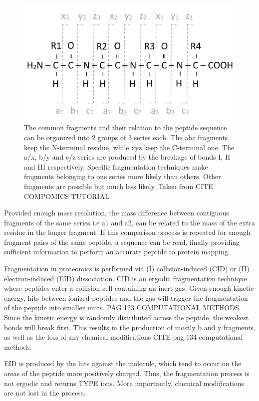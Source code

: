 \documentclass[11pt, a4paper]{report}
\begin{document}
\begin{figure}[!h]
\includegraphics[width=\textwidth]{abcxyz}
\caption{The common fragments and their relation to the peptide sequence can be organized into 2 groups of 3 series each. The abc fragments keep the N-terminal residue, while xyz keep the C-terminal one. The a/x, b/y and c/z series are produced by the breakage of bonds I, II and III respectively. Specific fragmentation techniques make fragments belonging to one series more likely than others. Other fragments are possible but much less likely. Taken from CITE COMPOMICS TUTORIAL}
\label{fig:abcxyz}
\end{figure}

Provided enough mass resolution, the mass difference between contiguous fragments of the same series i.e a1 and a2, can be related to the mass of the extra residue in the longer fragment. If this comparison process is repeated for enough fragment pairs of the same peptide, a sequence can be read, finally providing sufficient information to perform an accurate peptide to protein mapping.

Fragmentation in proteomics is performed via (I) collision-induced (CID) or (II) electron-induced (EID) dissociation. CID is an ergodic fragmentation technique where peptides enter a collision cell containing an inert gas. Given enough kinetic energy, hits between ionized peptides and the gas will trigger the fragmentation of the peptide into smaller units. PAG 123 COMPUTATIONAL METHODS. Since the kinetic energy is randomly distributed across the peptide, the weakest bonds will break first. This results in the production of mostly b and y fragments, as well as the loss of any chemical modifications CITE pag 134 computational methods.

EID is produced by the hits against the molecule, which tend to occur on the areas of the peptide more positively charged. Thus, the fragmentation process is not ergodic and returns TYPE ions. More importantly, chemical modifications are not lost in the process.
\end{document}
